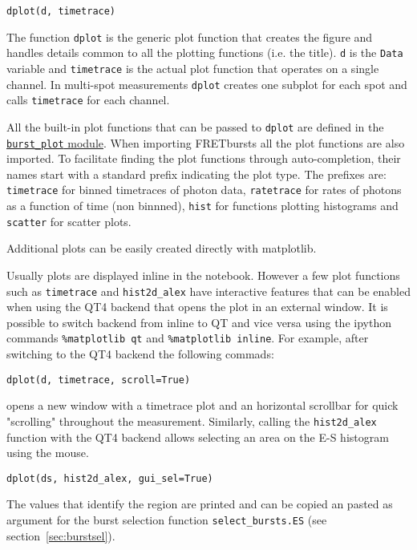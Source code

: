 \begin{verbatim}
dplot(d, timetrace)
\end{verbatim}

The function \verb|dplot| is the generic plot function that creates the figure
and handles details common to all the plotting functions (i.e. the title).
\verb|d| is the \verb|Data| variable and \verb|timetrace| is the actual plot
function that operates on a single channel. In multi-spot measurements
\verb|dplot| creates one subplot for each spot and calls \verb|timetrace| for
each channel.

All the built-in plot functions that can be passed to 
\verb|dplot| are defined in the 
\href{http://fretbursts.readthedocs.org/en/latest/plots.html}{\texttt{burst\_plot} module}. 
When importing FRETbursts all the plot functions are also imported. 
To facilitate finding the plot functions through auto-completion, 
their names start with a standard prefix indicating the
plot type. The prefixes are: \verb|timetrace| for binned timetraces
of photon data, \verb|ratetrace| for rates of photons as a function of time (non
binnned), \verb|hist| for functions plotting histograms and \verb|scatter| for
scatter plots.

Additional plots can be easily created directly with matplotlib.

Usually plots are displayed inline in the notebook. However a few plot functions
 such as \verb|timetrace| and \verb|hist2d_alex| have interactive features that
can be enabled when using the QT4 backend that opens the plot in an external
window. It is possible to switch backend from inline to QT and vice versa using
the ipython commands \verb|%matplotlib qt|
and \verb|%matplotlib inline|. For example, after switching to the QT4 backend
the following commads:

\begin{verbatim}
dplot(d, timetrace, scroll=True)
\end{verbatim}

opens a new window with a timetrace plot and an horizontal scrollbar for quick
"scrolling" throughout the measurement.
Similarly, calling the \verb|hist2d_alex| function with the QT4 backend allows
selecting an area on the E-S histogram using the mouse.

\begin{verbatim}
dplot(ds, hist2d_alex, gui_sel=True)
\end{verbatim}

The values that identify the region are printed and can be copied an pasted as
argument for the burst selection function \verb|select_bursts.ES| (see
section~\ref{sec:burstsel}).
